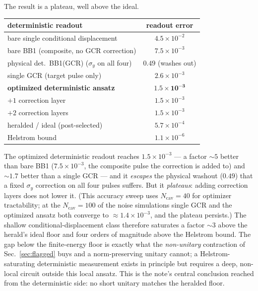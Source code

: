 \documentclass[11pt]{article}
\begin{document}
The result is a plateau, well above the ideal.
\begin{center}
\begin{tabular}{lc}
\toprule
deterministic readout & readout error\\
\midrule
bare single conditional displacement & $4.5\times10^{-2}$\\
bare BB1 (composite, no GCR correction) & $7.5\times10^{-3}$\\
physical det.\ BB1(GCR) ($\sigma_y$ on all four) & $0.49$ (washes out)\\
single GCR (target pulse only) & $2.6\times10^{-3}$\\
\textbf{optimized deterministic ansatz} & $\boldsymbol{1.5\times10^{-3}}$\\
\quad $+1$ correction layer & $1.5\times10^{-3}$\\
\quad $+2$ correction layers & $1.5\times10^{-3}$\\
\midrule
heralded / ideal (post-selected) & $5.7\times10^{-4}$\\
Helstrom bound & $1.1\times10^{-6}$\\
\bottomrule
\end{tabular}
\end{center}
The optimized deterministic readout reaches $1.5\times10^{-3}$ --- a factor $\sim\!5$ better than bare
BB1 ($7.5\times10^{-3}$, the composite pulse the correction is added to) and $\sim\!1.7$ better than a
single GCR --- and it \emph{escapes} the physical washout ($0.49$) that a fixed $\sigma_y$ correction on
all four pulses suffers. But it \emph{plateaus}: adding correction layers does not lower it. (This
accuracy sweep uses $N_{\mathrm{cav}}=40$ for optimizer tractability; at the $N_{\mathrm{cav}}=100$ of
the noise simulations single GCR and the optimized ansatz both converge to $\approx1.4\times10^{-3}$,
and the plateau persists.) The
shallow conditional-displacement class therefore saturates a factor $\sim\!3$ above the herald's ideal
floor and four orders of magnitude above the Helstrom bound. The gap below the finite-energy floor is
exactly what the \emph{non-unitary} contraction of Sec.~\ref{sec:flagged} buys and a norm-preserving
unitary cannot; a Helstrom-saturating deterministic measurement exists in principle but requires a
deep, non-local circuit outside this local ansatz. This is the note's central conclusion reached from
the deterministic side: no short unitary matches the heralded floor.
\end{document}

